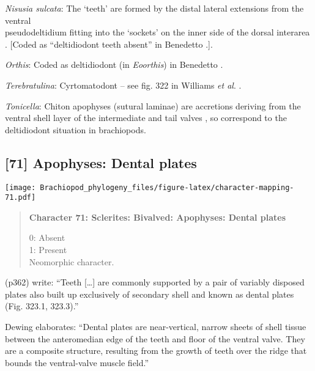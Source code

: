 \documentclass[openany]{book}
\theoremstyle{definition}
\theoremstyle{definition}
\theoremstyle{definition}
\theoremstyle{remark}
\begin{document}
\hypertarget{Nisusia_sulcata-coding-70}{}
\emph{Nisusia sulcata}: The `teeth' are formed by the distal lateral
extensions from the ventral\\
pseudodeltidium fitting into the `sockets' on the inner side of the
dorsal interarea \citep{Holmer2018Evolutionarysignificance}. {[}Coded as
``deltidiodont teeth absent'' in Benedetto
\citeyearpar{Benedetto2009iChaniella}.{]}.

\hypertarget{Orthis-coding-70}{}
\emph{Orthis}: Coded as deltidiodont (in \emph{Eoorthis}) in Benedetto
\citeyearpar{Benedetto2009iChaniella}.

\hypertarget{Terebratulina-coding-70}{}
\emph{Terebratulina}: Cyrtomatodont -- see fig. 322 in Williams \emph{et
al}. \citeyearpar{Williams2000LinguliformeaCraniiformea}.

\hypertarget{Tonicella-coding-70}{}
\emph{Tonicella}: Chiton apophyses (sutural laminae) are accretions
deriving from the ventral shell layer of the intermediate and tail
valves \citep{Schwabe2010}, so correspond to the deltidiodont situation
in brachiopods.

\subsection*{{[}71{]} Apophyses: Dental
plates}\label{apophyses-dental-plates}

\texttt{[image: Brachiopod\_phylogeny\_files/figure-latex/character-mapping-71.pdf]}

\begin{quote}
\textbf{Character 71: Sclerites: Bivalved: Apophyses: Dental plates}

0: Absent\\
1: Present\\
Neomorphic character.
\end{quote}

\citet{Williams1997Introduction} (p362) write: ``Teeth {[}\ldots{}{]}
are commonly supported by a pair of variably disposed plates also built
up exclusively of secondary shell and known as dental plates (Fig.
323.1, 323.3).''

Dewing \citeyearpar{Dewing2001Hingemodifications} elaborates: ``Dental
plates are near-vertical, narrow sheets of shell tissue between the
anteromedian edge of the teeth and floor of the ventral valve. They are
a composite structure, resulting from the growth of teeth over the ridge
that bounds the ventral-valve muscle field.''
\end{document}
